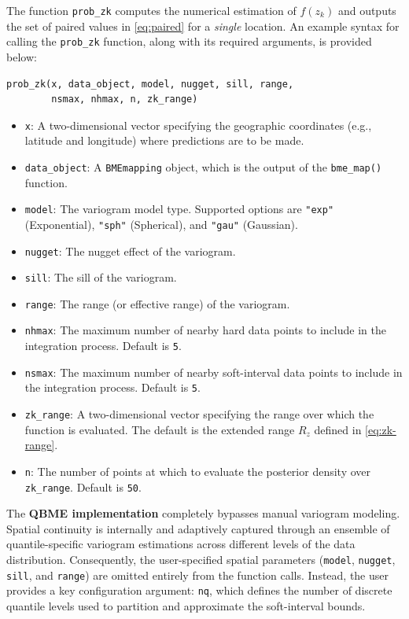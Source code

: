 The function \texttt{prob\_zk} computes the numerical estimation of \(f(z_k)\) and outputs the set of paired values in \eqref{eq:paired} for a \emph{single} location. An example syntax for calling the \texttt{prob\_zk} function, along with its required arguments, is provided below:

\begin{verbatim}
prob_zk(x, data_object, model, nugget, sill, range,
        nsmax, nhmax, n, zk_range)
\end{verbatim}

\begin{itemize}
\tightlist
\item
  \texttt{x}: A two-dimensional vector specifying the geographic coordinates (e.g., latitude and longitude) where predictions are to be made.
\item
  \texttt{data\_object}: A \texttt{BMEmapping} object, which is the output of the \texttt{bme\_map()} function.
\item
  \texttt{model}: The variogram model type. Supported options are \texttt{"exp"} (Exponential), \texttt{"sph"} (Spherical), and \texttt{"gau"} (Gaussian).
\item
  \texttt{nugget}: The nugget effect of the variogram.
\item
  \texttt{sill}: The sill of the variogram.
\item
  \texttt{range}: The range (or effective range) of the variogram.
\item
  \texttt{nhmax}: The maximum number of nearby hard data points to include in the integration process. Default is \texttt{5}.
\item
  \texttt{nsmax}: The maximum number of nearby soft-interval data points to include in the integration process. Default is \texttt{5}.
\item
  \texttt{zk\_range}: A two-dimensional vector specifying the range over which the function is evaluated. The default is the extended range \(R_z\) defined in \eqref{eq:zk-range}.
\item
  \texttt{n}: The number of points at which to evaluate the posterior density over \texttt{zk\_range}. Default is \texttt{50}.
\end{itemize}

The \textbf{QBME implementation} completely bypasses manual variogram modeling. Spatial continuity is internally and adaptively captured through an ensemble of quantile-specific variogram estimations across different levels of the data distribution. Consequently, the user-specified spatial parameters (\texttt{model}, \texttt{nugget}, \texttt{sill}, and \texttt{range}) are omitted entirely from the function calls. Instead, the user provides a key configuration argument: \texttt{nq}, which defines the number of discrete quantile levels used to partition and approximate the soft-interval bounds.

